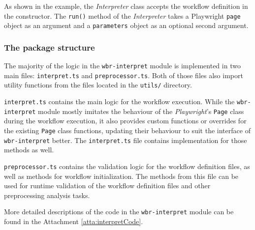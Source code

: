 As shown in the example, the \textit{Interpreter} class accepts the workflow definition in the constructor. The \texttt{run()} method of the \textit{Interpreter} takes a Playwright \texttt{page} object as an argument and a \texttt{parameters} object as an optional second argument.

\subsubsection{The package structure}

The majority of the logic in the \texttt{wbr-interpret} module is implemented in two main files: \texttt{interpret.ts} and \texttt{preprocessor.ts}.
Both of those files also import utility functions from the files located in the \texttt{utils/} directory.

\texttt{interpret.ts} contains the main logic for the workflow execution. 
While the \texttt{wbr-interpret} module mostly imitates the behaviour of the \textit{Playwright}'s \texttt{Page} class during the workflow execution,
it also provides custom functions or overrides for the existing \texttt{Page} class functions, updating their behaviour to suit the interface of \texttt{wbr-interpret} better.
The \texttt{interpret.ts} file contains implementation for those methods as well. 

\texttt{preprocessor.ts} contains the validation logic for the workflow definition files, as well as methods for workflow initialization.
The methods from this file can be used for runtime validation of the workflow definition files
and other preprocessing analysis tasks.

More detailed descriptions of the code in the \texttt{wbr-interpret} module can be found in the Attachment \ref{atta:interpretCode}.




